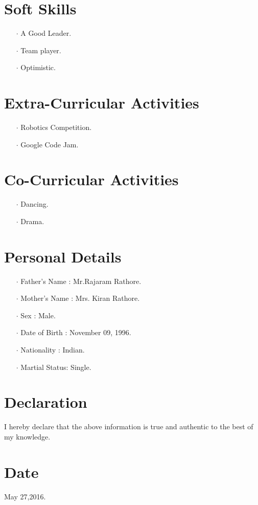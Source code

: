 \documentclass[12pt]{article}
\begin{document}
\section*{Soft Skills}
\begin{itemize}
\item[$\cdot$] A Good Leader.
\item[$\cdot$] Team player.
\item[$\cdot$] Optimistic. 
\end{itemize}
\section*{Extra-Curricular Activities}
\begin{itemize}
\item[$\cdot$] Robotics Competition.
\item[$\cdot$] Google Code Jam.
\end{itemize}
\section*{Co-Curricular Activities}
\begin{itemize} 
\item[$\cdot$] Dancing.
\item[$\cdot$] Drama. 
\end{itemize}
\section*{Personal Details}
\begin{itemize}
\item[$\cdot$]Father's Name : Mr.Rajaram Rathore.
\item[$\cdot$]Mother's Name : Mrs. Kiran Rathore.
\item[$\cdot$]Sex           : Male.
\item[$\cdot$]Date of Birth : November 09, 1996.
\item[$\cdot$]Nationality   : Indian.
\item[$\cdot$]Martial Status: Single.
\end{itemize}
\section*{Declaration} I hereby declare that the above information is true and authentic to the best of my knowledge.
\section*{Date} May 27,2016.
\end{document}
